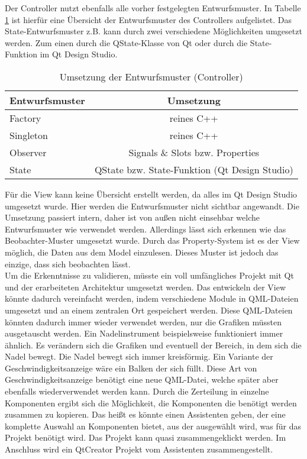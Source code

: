 Der Controller nutzt ebenfalls alle vorher festgelegten Entwurfsmuster. In Tabelle \ref{tab:patterns_controller} ist hierfür eine Übersicht der Entwurfsmuster des Controllers aufgelistet. Das State-Entwurfsmuster z.B. kann durch zwei verschiedene Möglichkeiten umgesetzt werden. Zum einen durch die QState-Klasse von Qt oder durch die State-Funktion im Qt Design Studio.\\

\begin{table}[htb]
	\caption[Umsetzung der Entwurfsmuster (Controller)]{Umsetzung der Entwurfsmuster (Controller)}
	\label{tab:patterns_controller}
	\centering
	\small
	\begin{tabular}{|l|c|}
		\hline
		Entwurfsmuster & Umsetzung \\ \hline
		Factory    & reines C++   \\ \hline
		Singleton & reines C++ \\ \hline
 		Observer  & Signals \& Slots bzw. Properties  \\ \hline
 		State & QState bzw. State-Funktion (Qt Design Studio) \\ \hline
		
	\end{tabular}
\end{table}

Für die View kann keine Übersicht erstellt werden, da alles im Qt Design Studio umgesetzt wurde. Hier werden die Entwurfsmuster nicht sichtbar angewandt. Die Umsetzung passiert intern, daher ist von außen nicht einsehbar welche Entwurfsmuster wie verwendet werden. Allerdings lässt sich erkennen wie das Beobachter-Muster umgesetzt wurde. Durch das Property-System ist es der View möglich, die Daten aus dem Model einzulesen. Dieses Muster ist jedoch das einzige, dass sich beobachten lässt.\\

Um die Erkenntnisse zu validieren, müsste ein voll umfängliches Projekt mit Qt und der erarbeiteten Architektur umgesetzt werden. Das entwickeln der View könnte dadurch vereinfacht werden, indem verschiedene Module in QML-Dateien umgesetzt und an einem zentralen Ort gespeichert werden. Diese QML-Dateien könnten dadurch immer wieder verwendet werden, nur die Grafiken müssten ausgetauscht werden. Ein Nadelinstrument beispielsweise funktioniert immer ähnlich. Es verändern sich die Grafiken und eventuell der Bereich, in dem sich die Nadel bewegt. Die Nadel bewegt sich immer kreisförmig. Ein Variante der Geschwindigkeitsanzeige wäre ein Balken der sich füllt. Diese Art von Geschwindigkeitsanzeige benötigt eine neue QML-Datei, welche später aber ebenfalls wiederverwendet werden kann. Durch die Zerteilung in einzelne Komponenten ergibt sich die Möglichkeit, die Komponenten die benötigt werden zusammen zu kopieren. Das heißt es könnte einen Assistenten geben, der eine komplette Auswahl an Komponenten bietet, aus der ausgewählt wird, was für das Projekt benötigt wird. Das Projekt kann quasi zusammengeklickt werden. Im Anschluss wird ein QtCreator Projekt vom Assistenten zusammengestellt. \\



  
